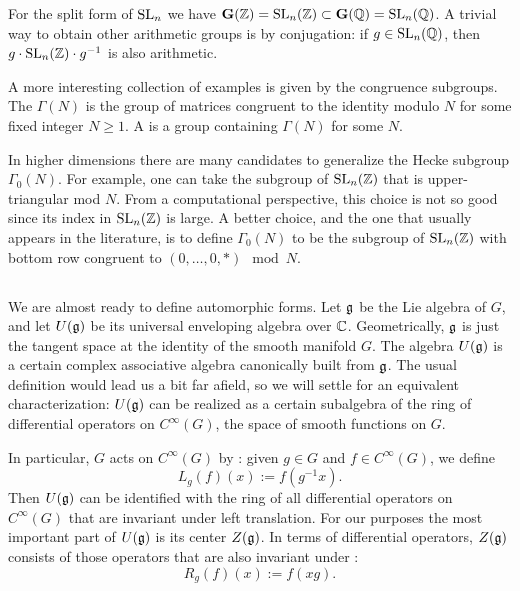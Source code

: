 \begin{example}\label{ex:cong.subgp}
For the split form of $\operatorname{SL}_{n}$ we have $\mathbf{G} (\mathbb{Z}) = \operatorname{SL}_{n} (\mathbb{Z})
\subset \mathbf{G} (\mathbb{Q}) = \operatorname{SL}_{n} (\mathbb{Q})$.  A trivial way to obtain other
arithmetic groups is by conjugation: if $g\in \operatorname{SL}_{n} (\mathbb{Q})$, then
$g\cdot \operatorname{SL}_{n} (\mathbb{Z}) \cdot g^{-1}$ is also arithmetic.

A more interesting collection of examples is given by the congruence
subgroups.  The  $\Gamma (N)$ is
the group of matrices congruent to the identity modulo $N$ for some
fixed integer $N\geq 1$.  A  is a group
containing $\Gamma (N)$ for some $N$.

In higher dimensions there are many candidates to generalize the Hecke
subgroup $\Gamma_{0} (N)$.  For example, one can take the
subgroup of $\operatorname{SL}_{n} (\mathbb{Z})$ that is upper-triangular mod $N$.  From
a computational perspective, this choice is not so good since its
index in $\operatorname{SL}_{n} (\mathbb{Z})$ is large.  A better choice, and the one that
usually appears in the literature, is to define $\Gamma_{0} (N)$ to be
the subgroup of $\operatorname{SL}_{n} (\mathbb{Z})$ with bottom row congruent to $(0,\dotsc
,0,*) \mod N$.
\end{example}

\subsection{}\label{ss:aut.forms} 
%
We are almost ready to define automorphic forms.  Let $\mathfrak g$ be the Lie
algebra of $G$, and let $U (\mathfrak g)$ be its universal enveloping algebra
over $\mathbb{C}$.  Geometrically, $\mathfrak g$ is just the tangent space at the
identity of the smooth manifold $G$.  The algebra $U (\mathfrak g)$ is a
certain complex associative algebra canonically built from $\mathfrak g$.  The
usual definition would lead us a bit far afield, so we will settle for an
equivalent characterization: $U (\mathfrak g)$ can be realized as a certain
subalgebra of the ring of differential operators on $C^{\infty} (G)$,
the space of smooth functions on $G$.

In particular, $G$ acts on $C^{\infty} (G)$ by : given $g\in G$ and $f\in C^{\infty} (G)$, we define
\[
L_{g} (f) (x) := f (g^{-1}x).
\]
Then $U (\mathfrak g)$ can be identified with the ring of all differential
operators on $C^{\infty} (G)$ that are invariant under left
translation.  For our purposes the most important part of $U (\mathfrak g)$ is
its center $Z (\mathfrak g)$.  In
terms of differential operators, $Z (\mathfrak g)$ consists of those operators
that are also invariant under :
\[
R_{g} (f) (x) := f (xg).
\]

